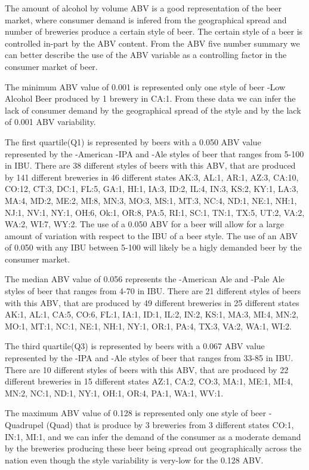 \documentclass[]{article}
\begin{document}
The amount of alcohol by volume ABV is a good representation of the beer
market, where consumer demand is infered from the geographical spread
and number of breweries produce a certain style of beer. The certain
style of a beer is controlled in-part by the ABV content. From the ABV
five number summary we can better describe the use of the ABV variable
as a controlling factor in the consumer market of beer.

The minimum ABV value of 0.001 is represented only one style of beer
-Low Alcohol Beer produced by 1 brewery in CA:1. From these data we can
infer the lack of consumer demand by the geographical spread of the
style and by the lack of 0.001 ABV variability.

The first quartile(Q1) is represented by beers with a 0.050 ABV value
represented by the -American -IPA and -Ale styles of beer that ranges
from 5-100 in IBU. There are 38 different styles of beers with this ABV,
that are produced by 141 different breweries in 46 different states
AK:3, AL:1, AR:1, AZ:3, CA:10, CO:12, CT:3, DC:1, FL:5, GA:1, HI:1,
IA:3, ID:2, IL:4, IN:3, KS:2, KY:1, LA:3, MA:4, MD:2, ME:2, MI:8, MN:3,
MO:3, MS:1, MT:3, NC:4, ND:1, NE:1, NH:1, NJ:1, NV:1, NY:1, OH:6, Ok:1,
OR:8, PA:5, RI:1, SC:1, TN:1, TX:5, UT:2, VA:2, WA:2, WI:7, WY:2. The
use of a 0.050 ABV for a beer will allow for a large amount of variation
with respect to the IBU of a beer style. The use of an ABV of 0.050 with
any IBU between 5-100 will likely be a higly demanded beer by the
consumer market.

The median ABV value of 0.056 represents the -American Ale and -Pale Ale
styles of beer that ranges from 4-70 in IBU. There are 21 different
styles of beers with this ABV, that are produced by 49 different
breweries in 25 different states AK:1, AL:1, CA:5, CO:6, FL:1, IA:1,
ID:1, IL:2, IN:2, KS:1, MA:3, MI:4, MN:2, MO:1, MT:1, NC:1, NE:1, NH:1,
NY:1, OR:1, PA:4, TX:3, VA:2, WA:1, WI:2.

The third quartile(Q3) is represented by beers with a 0.067 ABV value
represented by the -IPA and -Ale styles of beer that ranges from 33-85
in IBU. There are 10 different styles of beers with this ABV, that are
produced by 22 different breweries in 15 different states AZ:1, CA:2,
CO:3, MA:1, ME:1, MI:4, MN:2, NC:1, ND:1, NY:1, OH:1, OR:4, PA:1, WA:1,
WV:1.

The maximum ABV value of 0.128 is represented only one style of beer
-Quadrupel (Quad) that is produce by 3 breweries from 3 different states
CO:1, IN:1, MI:1, and we can infer the demand of the consumer as a
moderate demand by the breweries producing these beer being spread out
geographically across the nation even though the style variability is
very-low for the 0.128 ABV.
\end{document}
